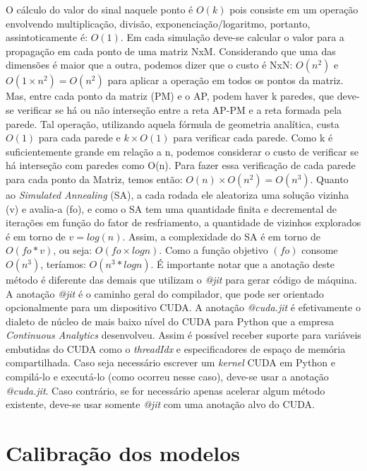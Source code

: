 \documentclass[
	12pt,				%
	openright,			%
	twoside,			%
	a4paper,			%
	english,			%
	french,				%
	spanish,			%
	brazil				%
	]{abntex2}
\begin{document}


O cálculo do valor do sinal naquele ponto é $ O(k) $ pois consiste em um operação envolvendo multiplicação, divisão, exponenciação/logaritmo, portanto, assintoticamente é: $ O(1) $. Em cada simulação deve-se calcular o valor para a propagação em cada ponto de uma matriz NxM. Considerando que uma das dimensões é maior que a outra, podemos dizer que o custo é NxN: $ O(n^{2}) $ e $ O(1\times n^{2}) = O(n^{2}) $ para aplicar a operação em todos os pontos da matriz. Mas, entre cada ponto da matriz (PM) e o AP, podem haver k paredes, que deve-se verificar se há ou não interseção entre a reta AP-PM e a reta formada pela parede. Tal operação, utilizando aquela fórmula de geometria analítica, custa $ O(1) $ para cada parede e $ k\times O(1) $ para verificar cada parede. Como k é suficientemente grande em relação a n, podemos considerar o custo de verificar se há interseção com paredes como O(n). Para fazer essa verificação de cada parede para cada ponto da Matriz, temos então: $ O(n)\times O(n^{2}) = O(n^{3}) $.
Quanto ao \textit{Simulated Annealing} (SA), a cada rodada ele aleatoriza uma solução vizinha (v) e avalia-a (fo), e como o SA tem uma quantidade finita e decremental de iterações em função do fator de resfriamento, a quantidade de vizinhos explorados é em torno de $ v = log(n) $. Assim, a complexidade do SA é em torno de $ O(fo*v) $, ou seja: $ O(fo \times log n) $. Como a função objetivo $ (fo) $ consome $ O(n^{3}) $, teríamos: $ O(n^{3} * log n) $.
É importante notar que a anotação deste método é diferente das demais que utilizam o \textit{@jit} para gerar código de máquina. A anotação \textit{@jit} é o caminho geral do compilador, que pode ser orientado opcionalmente para um dispositivo CUDA. A anotação \textit{@cuda.jit} é efetivamente o dialeto de núcleo de mais baixo nível do CUDA para Python que a empresa \textit{Continuous Analytics} desenvolveu.  Assim é possível receber suporte para variáveis embutidas do CUDA como o \textit{threadIdx} e especificadores de espaço de memória compartilhada. Caso seja necessário escrever um \textit{kernel} CUDA em Python e compilá-lo e executá-lo (como ocorreu nesse caso), deve-se usar a anotação \textit{@cuda.jit}. Caso contrário, se for necessário apenas acelerar algum método existente, deve-se usar somente \textit{@jit} com uma anotação alvo do CUDA.



\section[Calibração dos modelos ]{Calibração dos modelos }
\end{document}
